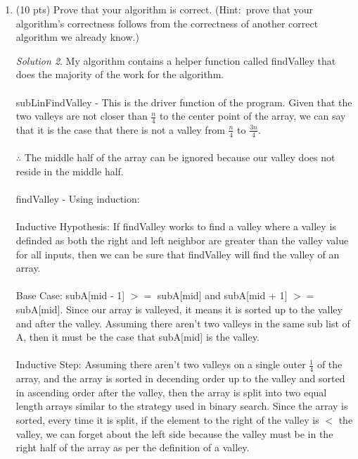 \documentclass[12pt]{article}
\theoremstyle{remark}
\newtheorem*{solution}{Solution}
\begin{document}
\begin{enumerate}
\begin{enumerate}
\begin{solution}
\begin{verbatim}
def subLinFindValley(A):
   n = len(A) - 1
   low = A[0. . . n / 4]
   high = A[3n/4 . . . n]
   
   return min(findValley(low,0,len(low)-1), findValley(high,0,len(high)-1))
   
   
   
\end{verbatim}
        \end{solution}
        \pagebreak

	    \item (10 pts) Prove that your algorithm is correct. (Hint:\ prove that your algorithm's correctness follows from the correctness of another correct algorithm we already know.)
	    \begin{solution}
    My algorithm contains a helper function called findValley that does the majority of the work for the algorithm. \\ \\
subLinFindValley - This is the driver function of the program. Given that the two valleys are not closer than $\frac{n}{4}$ to the center point of the array, we can say that it is the case that there is not a valley from $\frac{n}{4}$ to $\frac{3n}{4}$. \\ \\ 
$\therefore$ The middle half of the array can be ignored because our valley does not reside in the middle half. \\ \\
findValley - Using induction: \\ \\
Inductive Hypothesis: If findValley works to find a valley where a valley is definded as both the right and left neighbor are greater than the valley value for all inputs, then we can be sure that findValley will find the valley of an array. \\ \\
Base Case: subA[mid - 1] $>=$ subA[mid] and subA[mid + 1] $>=$ subA[mid]. Since our array is valleyed, it means it is sorted up to the valley and after the valley. Assuming there aren't two valleys in the same sub list of A, then it must be the case that subA[mid] is the valley. \\ \\
Inductive Step: Assuming there aren't two valleys on a single outer $\frac{1}{4}$ of the array, and the array is sorted in decending order up to the valley and sorted in ascending order after the valley, then the array is split into two equal length arrays similar to the strategy used in binary search. Since the array is sorted, every time it is split, if the element to the right of the valley is $<$ the valley, we can forget about the left side because the valley must be in the right half of the array as per the definition of a valley. \\ \\

\end{solution}
\end{enumerate}
\end{enumerate}
\end{document}
